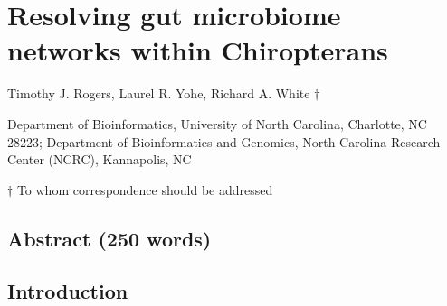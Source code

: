 \documentclass[
]{article}
\author{}
\date{\vspace{-2.5em}}
\begin{document}
\section{Resolving gut microbiome networks within
Chiropterans}\label{resolving-gut-microbiome-networks-within-chiropterans}

Timothy J. Rogers, Laurel R. Yohe, Richard A. White \({\dagger}\)

Department of Bioinformatics, University of North Carolina, Charlotte,
NC 28223; Department of Bioinformatics and Genomics, North Carolina
Research Center (NCRC), Kannapolis, NC

\({\dagger}\) To whom correspondence should be addressed

\newpage

\subsection{Abstract (250 words)}\label{abstract-250-words}

\newpage

\subsection{Introduction}\label{introduction}
\end{document}
